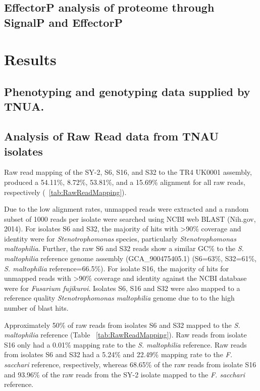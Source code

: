 \subsection{EffectorP analysis of proteome through SignalP and EffectorP}


\section{Results}
\subsection{Phenotyping and genotyping data supplied by TNUA.}

\subsection{Analysis of Raw Read data from TNAU isolates}

Raw read mapping of the SY-2, S6, S16, and S32 to the \Focub TR4 UK0001 assembly, produced a 54.11\%, 8.72\%, 53.81\%, and a 15.69\% alignment for all raw reads, respectively (~\ref{tab:RawReadMapping}). 

Due to the low alignment rates, unmapped reads were extracted and a random subset of 1000 reads per isolate were searched using NCBI web BLAST (Nih.gov, 2014). For isolates S6 and S32, the majority of hits with >90\% coverage and identity were for \textit{Stenotrophomonas} species, particularly \textit{Stenotrophomonas maltophilia}. Further, the raw S6 and S32 reads show a similar GC\% to the \textit{S. maltophilia }reference genome assembly (GCA\_900475405.1) (S6=63\%, S32=61\%, \textit{S. maltophilia} reference=66.5\%). For isolate S16, the majority of hits for unmapped reads with >90\% coverage and identity against the NCBI database were for \textit{Fusarium fujikuroi}. Isolates S6, S16 and S32 were also mapped to a reference quality \textit{Stenotrophomonas maltophilia} genome due to to the high number of blast hits. 

Approximately 50\% of raw reads from isolates S6 and S32 mapped to the \textit{S. maltophilia} reference (Table ~\ref{tab:RawReadMapping}). Raw reads from isolate S16 only had a 0.01\% mapping rate to the \textit{S. maltophilia} reference. Raw reads from isolates S6 and S32 had a 5.24\% and 22.49\% mapping rate to the \textit{F. sacchari} reference, respectively, whereas 68.65\% of the raw reads from isolate S16 and 93.96\% of the raw reads from the SY-2 isolate mapped to the \textit{F. sacchari} reference. 


